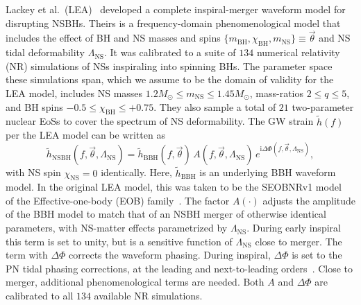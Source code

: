 \documentclass[aps,prd,amsmath,floats,floatfix, twocolumn,
superscriptaddress,nofootinbib,showpacs]{revtex4-1}
\newcommand{\red}{\textcolor{red}}
\newcommand{\lambdans}{\Lambda_\mathrm{NS}}
\newcommand{\ii}{\mathrm{i}}
\newcommand{\chibh}{\chi_\mathrm{BH}}
\newcommand{\chins}{\chi_\mathrm{NS}}
\newcommand{\mbh}{m_\mathrm{BH}}
\newcommand{\mns}{m_\mathrm{NS}}
\begin{document}

Lackey et al.~(LEA)~\cite{Lackey:2013axa} developed a complete inspiral-merger
waveform model for disrupting NSBHs. Theirs is a frequency-domain
phenomenological model that includes the effect of BH and NS masses and spins
$\{\mbh, \chibh, \mns\}\equiv\vec{\theta}$ and NS tidal deformability
$\lambdans$. It was calibrated to a suite of $134$ numerical relativity (NR)
simulations of NSs inspiraling into spinning BHs. The parameter space these
simulations span, which we assume to be the domain of validity for the LEA
model, includes NS masses $1.2M_\odot\leq\mns\leq 1.45M_\odot$,
mass-ratios $2\leq q\leq 5$, and BH spins $-0.5\leq\chibh\leq+0.75$.
They also sample a total of $21$ two-parameter nuclear EoSs to cover the
spectrum of NS deformability.
% 
% 
The GW strain $\tilde{h}(f)$ per the LEA model can be written as
\begin{equation}
 \tilde{h}_\mathrm{NSBH}(f, \vec{\theta}, \lambdans) = \tilde{h}_\mathrm{BBH}(f, \vec{\theta})\,A(f, \vec{\theta}, \lambdans)\,e^{\ii \Delta\Phi(f, \vec{\theta}, \lambdans)},
\end{equation}
with NS spin $\chins=0$ identically. Here, $\tilde{h}_\mathrm{BBH}$ is
an underlying BBH waveform model. In the original LEA model,
this was taken to be the SEOBNRv1
model~\cite{Taracchini:2012} of the Effective-one-body (EOB)
family~\cite{Buonanno99}. The factor $A(\cdot)$ adjusts
the amplitude of the BBH model to match that of an NSBH merger of otherwise
identical parameters, with NS-matter effects parametrized by $\lambdans$.
During early inspiral this term is set to
unity, but is a sensitive function of $\lambdans$ close to merger. The term with
$\Delta\Phi$ corrects the waveform phasing. During inspiral,
$\Delta\Phi$ is set to the PN tidal phasing corrections,
at the leading and next-to-leading orders~\cite{Vines2011}. Close to merger,
additional phenomenological terms are needed. Both $A$ and $\Delta\Phi$ are
calibrated to all $134$ available NR simulations.
\end{document}
